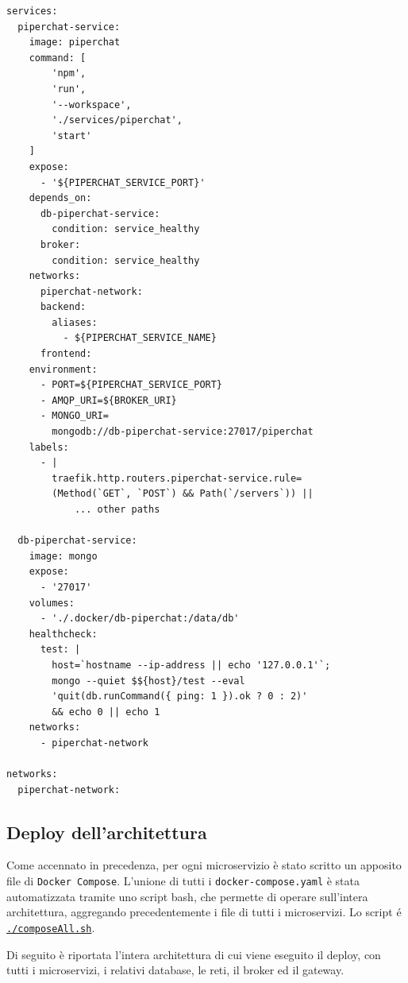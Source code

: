 \begin{lstlisting}[style=yaml, caption={microservice Test}, label=lst:compose-yaml]
services:
  piperchat-service:
    image: piperchat
    command: [
        'npm', 
        'run', 
        '--workspace', 
        './services/piperchat', 
        'start'
    ]
    expose:
      - '${PIPERCHAT_SERVICE_PORT}'
    depends_on:
      db-piperchat-service:
        condition: service_healthy
      broker:
        condition: service_healthy
    networks:
      piperchat-network:
      backend:
        aliases:
          - ${PIPERCHAT_SERVICE_NAME}
      frontend:
    environment:
      - PORT=${PIPERCHAT_SERVICE_PORT}
      - AMQP_URI=${BROKER_URI}
      - MONGO_URI=
        mongodb://db-piperchat-service:27017/piperchat
    labels:
      - |
        traefik.http.routers.piperchat-service.rule=
        (Method(`GET`, `POST`) && Path(`/servers`)) ||
            ... other paths

  db-piperchat-service:
    image: mongo
    expose:
      - '27017'
    volumes:
      - './.docker/db-piperchat:/data/db'
    healthcheck:
      test: |
        host=`hostname --ip-address || echo '127.0.0.1'`;
        mongo --quiet $${host}/test --eval 
        'quit(db.runCommand({ ping: 1 }).ok ? 0 : 2)' 
        && echo 0 || echo 1
    networks:
      - piperchat-network

networks:
  piperchat-network:

\end{lstlisting}

%
%
%
\subsection{Deploy dell'architettura}

Come accennato in precedenza, per ogni microservizio è stato scritto un apposito file di \texttt{Docker Compose}.
%
L'unione di tutti i \texttt{docker-compose.yaml} è stata automatizzata tramite uno script bash, che permette di operare sull'intera architettura, aggregando precedentemente i file di tutti i microservizi.
%
Lo script é \href{https://github.com/zucchero-sintattico/piperchat/blob/develop/composeAll.sh}{\texttt{./composeAll.sh}}.

Di seguito è riportata l'intera architettura di cui viene eseguito il deploy, con tutti i microservizi, i relativi database, le reti, il broker ed il gateway.


